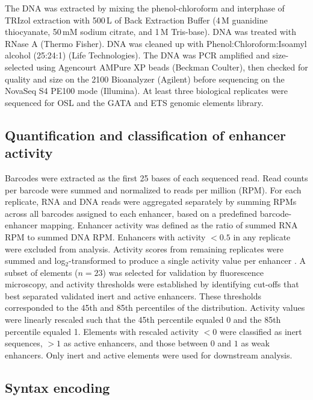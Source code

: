 The DNA was extracted by mixing the phenol-chloroform and interphase of TRIzol extraction with 500\,\textmu L of Back Extraction Buffer (4\,M guanidine thiocyanate, 50\,mM sodium citrate, and 1\,M Tris-base). DNA was treated with RNase A (Thermo Fisher). DNA was cleaned up with Phenol:Chloroform:Isoamyl alcohol (25:24:1) (Life Technologies). The DNA was PCR amplified and size-selected using Agencourt AMPure XP beads (Beckman Coulter), then checked for quality and size on the 2100 Bioanalyzer (Agilent) before sequencing on the NovaSeq S4 PE100 mode (Illumina). At least three biological replicates were sequenced for OSL and the GATA and ETS genomic elements library.

\subsection{Quantification and classification of enhancer activity}

Barcodes were extracted as the first 25 bases of each sequenced read. Read counts per barcode were summed and normalized to reads per million (RPM). For each replicate, RNA and DNA reads were aggregated separately by summing RPMs across all barcodes assigned to each enhancer, based on a predefined barcode-enhancer mapping. Enhancer activity was defined as the ratio of summed RNA RPM to summed DNA RPM. Enhancers with activity $< 0.5$ in any replicate were excluded from analysis. Activity scores from remaining replicates were summed and log$_2$-transformed to produce a single activity value per enhancer \cite{Ashuach2019-qp}. A subset of elements ($n = 23$) was selected for validation by fluorescence microscopy, and activity thresholds were established by identifying cut-offs that best separated validated inert and active enhancers. These thresholds corresponded to the 45th and 85th percentiles of the distribution. Activity values were linearly rescaled such that the 45th percentile equaled 0 and the 85th percentile equaled 1. Elements with rescaled activity $< 0$ were classified as inert sequences, $> 1$ as active enhancers, and those between $0$ and $1$ as weak enhancers. Only inert and active elements were used for downstream analysis.

\subsection{Syntax encoding}

